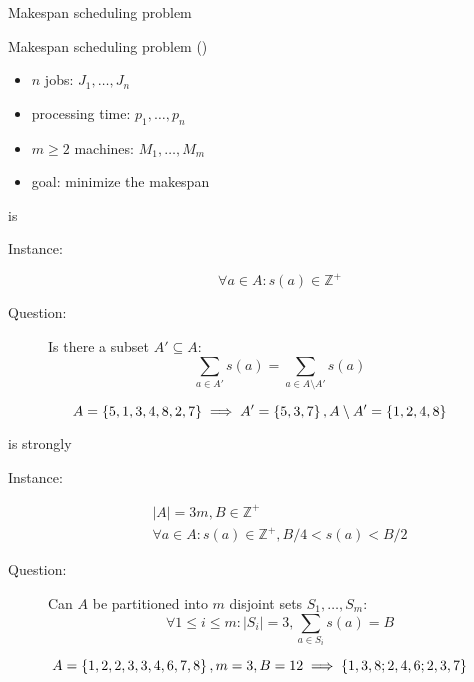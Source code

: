 
\begin{frame}{Makespan scheduling problem}
  \begin{exampleblock}{Makespan scheduling problem (\ms{})}
	\begin{itemize}
	  \item $n$ jobs: $J_1, \dots, J_n$
	  \item processing time: $p_1, \dots, p_n$
	  \item $m \ge 2$ machines: $M_1, \dots, M_m$
	 ­\item goal: minimize the makespan
	\end{itemize}
  \end{exampleblock}
\end{frame}
\begin{frame}{\ms{} is \npc{}}
  \begin{definition}[Partition]
	\begin{description}
	  \item[Instance:] 
		\[
		  \forall a \in A: s(a) \in \mathbb{Z}^{+} 
		\]
	  \item[Question:] Is there a subset $A' \subseteq A$: 
		\[
		  \sum_{a \in A'} s(a) = \sum_{a \in A \setminus A'} s(a)
		\]
	\end{description}
  \end{definition}

  \[
	A = \left\{ 5,1,3,4,8,2,7 \right\} \implies A' = \left\{ 5,3,7 \right\}, A \setminus A' = \left\{ 1,2,4,8 \right\}
  \]
\end{frame}
\begin{frame}{\ms{} is strongly \npc{}}
  \begin{definition}[$3$-Partition]
	\begin{description}
	  \item[Instance:] 
		\begin{gather*}
		  |A| = 3m, B \in \mathbb{Z}^{+} \\
		  \forall a \in A: s(a) \in \mathbb{Z}^{+}, B/4 < s(a) < B/2
		\end{gather*}
	  \item[Question:] Can $A$ be partitioned into $m$ disjoint sets $S_1,\dots,S_m$:
		\[
		  \forall 1 \le i \le m: |S_i| = 3, \sum_{a \in S_i} s(a) = B
		\]
	\end{description}
  \end{definition}

  \[
	A = \left\{ 1,2,2,3,3,4,6,7,8 \right\}, m = 3, B = 12 \implies \left\{ 1,3,8; 2,4,6; 2,3,7 \right\}
  \]
\end{frame}
